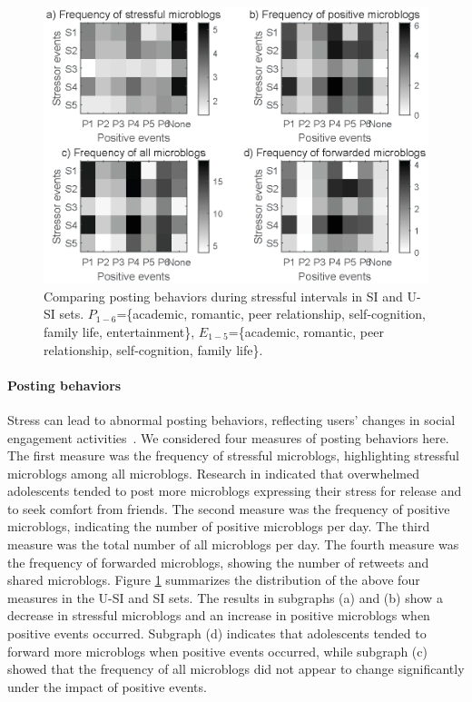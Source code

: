 \begin{figure}[h]
\centering
\includegraphics[width=\linewidth]{figs/gray/post.eps}
\caption{\small{Comparing posting behaviors during stressful intervals in SI and U-SI sets.
$P_{1-6}$=\{academic, romantic, peer relationship, self-cognition, family life, entertainment\},
$E_{1-5}$=\{academic, romantic, peer relationship, self-cognition, family life\}.}}
\label{fig:post}
\end{figure}

\paragraph{\textbf{Posting behaviors}}
Stress can lead to abnormal posting behaviors,
reflecting users' changes in social engagement activities~\citep{Liang2015Teenagers}.
We considered four measures of posting behaviors here.
The first measure was the frequency of stressful microblogs,
highlighting stressful microblogs among all microblogs.
Research in \cite{Li2017Analyzing} indicated that overwhelmed adolescents
tended to post more microblogs expressing their stress for release and to seek comfort from friends.
The second measure was the frequency of positive microblogs,
indicating the number of positive microblogs per day.
The third measure was the total number of all microblogs per day.
The fourth measure was the frequency of forwarded microblogs,
showing the number of retweets and shared microblogs.
Figure \ref{fig:post} summarizes the distribution of the above four measures in the U-SI and SI sets.
The results in subgraphs (a) and (b) show a decrease in stressful microblogs and
an increase in positive microblogs when positive events occurred.
Subgraph (d) indicates that adolescents tended to forward more microblogs when positive events occurred,
while subgraph (c) showed that the frequency of all microblogs did not appear to change significantly under the impact of positive events.

